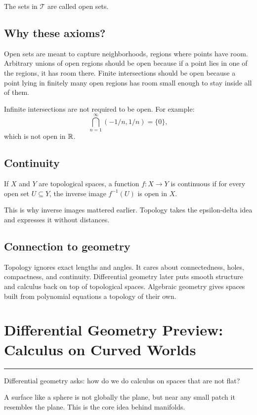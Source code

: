 \documentclass[12pt]{article}
\newcommand{\chapterline}{\vspace{0.4em}\hrule\vspace{0.8em}}
\begin{document}
The sets in $\mathcal{T}$ are called open sets.

\subsection{Why these axioms?}

Open sets are meant to capture neighborhoods, regions where points have room. Arbitrary unions of open regions should be open because if a point lies in one of the regions, it has room there. Finite intersections should be open because a point lying in finitely many open regions has room small enough to stay inside all of them.

Infinite intersections are not required to be open. For example:
\[
\bigcap_{n=1}^{\infty}(-1/n,1/n)=\{0\},
\]
which is not open in $\mathbb{R}$.

\subsection{Continuity}

\begin{definition}
If $X$ and $Y$ are topological spaces, a function $f:X\to Y$ is continuous if for every open set $U\subseteq Y$, the inverse image $f^{-1}(U)$ is open in $X$.
\end{definition}

This is why inverse images mattered earlier. Topology takes the epsilon-delta idea and expresses it without distances.

\subsection{Connection to geometry}

Topology ignores exact lengths and angles. It cares about connectedness, holes, compactness, and continuity. Differential geometry later puts smooth structure and calculus back on top of topological spaces. Algebraic geometry gives spaces built from polynomial equations a topology of their own.

\newpage
\section{Differential Geometry Preview: Calculus on Curved Worlds}
\chapterline

Differential geometry asks: how do we do calculus on spaces that are not flat?

A surface like a sphere is not globally the plane, but near any small patch it resembles the plane. This is the core idea behind manifolds.
\end{document}
